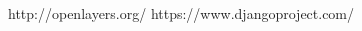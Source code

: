 \begin{thebibliography}{99}

 
 http://openlayers.org/
 https://www.djangoproject.com/

\end{thebibliography}

